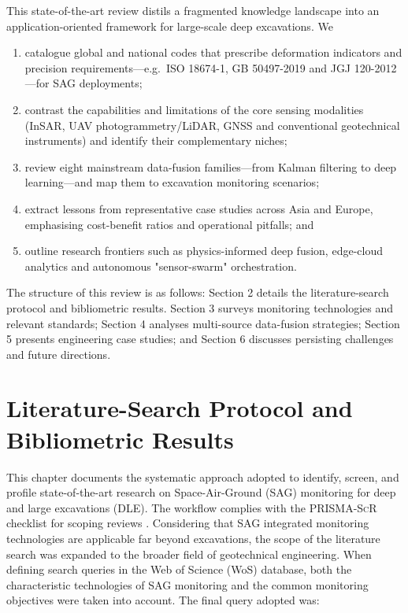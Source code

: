 \documentclass[preprint,11pt,authoryear,3p]{elsarticle}
\begin{document}
This state-of-the-art review distils a fragmented knowledge landscape into an application-oriented
framework for large-scale deep excavations. We

\begin{enumerate}
  \item catalogue global and national codes that prescribe deformation indicators and precision
        requirements—e.g.\ ISO 18674-1, GB 50497-2019 and JGJ 120-2012—for SAG deployments;
  \item contrast the capabilities and limitations of the core sensing modalities (InSAR, UAV
        photogrammetry/LiDAR, GNSS and conventional geotechnical instruments) and identify their
        complementary niches;
  \item review eight mainstream data-fusion families—from Kalman filtering to deep learning—and
        map them to excavation monitoring scenarios;
  \item extract lessons from representative case studies across Asia and Europe, emphasising
        cost-benefit ratios and operational pitfalls; and
  \item outline research frontiers such as physics-informed deep fusion, edge-cloud analytics and
        autonomous "sensor-swarm" orchestration.
\end{enumerate}

The structure of this review is as follows:
Section 2 details the literature-search protocol and bibliometric results.
Section 3 surveys monitoring technologies and relevant standards;
Section 4 analyses multi-source data-fusion strategies;
Section 5 presents engineering case studies; and
Section 6 discusses persisting challenges and future directions.

\section{Literature-Search Protocol and Bibliometric Results}

This chapter documents the systematic approach adopted to identify, screen, and profile state-of-the-art research on Space-Air-Ground (SAG) monitoring for deep and large excavations (DLE). The workflow complies with the \textsc{PRISMA-ScR} checklist for scoping reviews \citep{PRISMA-ScR}. 
Considering that SAG integrated monitoring technologies are applicable far beyond excavations, the scope of the literature search was expanded to the broader field of geotechnical engineering. When defining search queries in the Web of Science (WoS) database, both the characteristic technologies of SAG monitoring and the common monitoring objectives were taken into account. The final query adopted was: 
\end{document}
